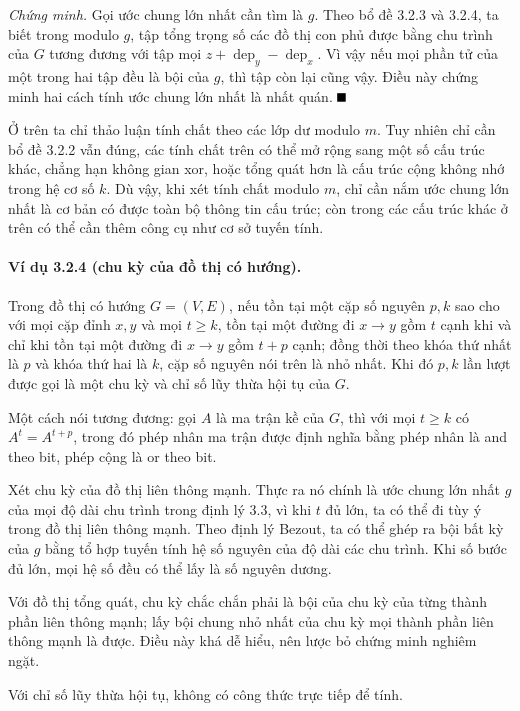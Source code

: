 \documentclass[11pt]{article}
\renewcommand{\leadsto}{\mathrel{\longrightarrow}}
\providecommand{\square}{\mathord{\vcenter{\hrule height .6em width .6em}}}
\begin{document}
\emph{Chứng minh.}
Gọi ước chung lớn nhất cần tìm là $g$. Theo bổ đề 3.2.3 và 3.2.4, ta biết trong
modulo $g$, tập tổng trọng số các đồ thị con phủ được bằng chu trình của $G$
tương đương với tập mọi $z+\operatorname{dep}_y-\operatorname{dep}_x$. Vì vậy
nếu mọi phần tử của một trong hai tập đều là bội của $g$, thì tập còn lại cũng
vậy. Điều này chứng minh hai cách tính ước chung lớn nhất là nhất quán.
\hfill$\square$

Ở trên ta chỉ thảo luận tính chất theo các lớp dư modulo $m$. Tuy nhiên chỉ cần
bổ đề 3.2.2 vẫn đúng, các tính chất trên có thể mở rộng sang một số cấu trúc
khác, chẳng hạn không gian xor, hoặc tổng quát hơn là cấu trúc cộng không nhớ
trong hệ cơ số $k$. Dù vậy, khi xét tính chất modulo $m$, chỉ cần nắm ước chung
lớn nhất là cơ bản có được toàn bộ thông tin cấu trúc; còn trong các cấu trúc
khác ở trên có thể cần thêm công cụ như cơ sở tuyến tính.

\paragraph{Ví dụ 3.2.4 (chu kỳ của đồ thị có hướng).}
Trong đồ thị có hướng $G=(V,E)$, nếu tồn tại một cặp số nguyên $p,k$ sao cho với
mọi cặp đỉnh $x,y$ và mọi $t\ge k$, tồn tại một đường đi $x\leadsto y$ gồm
$t$ cạnh khi và chỉ khi tồn tại một đường đi $x\leadsto y$ gồm $t+p$ cạnh; đồng
thời theo khóa thứ nhất là $p$ và khóa thứ hai là $k$, cặp số nguyên nói trên là
nhỏ nhất. Khi đó $p,k$ lần lượt được gọi là một chu kỳ và chỉ số lũy thừa hội tụ
của $G$.

Một cách nói tương đương: gọi $A$ là ma trận kề của $G$, thì với mọi $t\ge k$ có
$A^t=A^{t+p}$, trong đó phép nhân ma trận được định nghĩa bằng phép nhân là and
theo bit, phép cộng là or theo bit.

Xét chu kỳ của đồ thị liên thông mạnh. Thực ra nó chính là ước chung lớn nhất
$g$ của mọi độ dài chu trình trong định lý 3.3, vì khi $t$ đủ lớn, ta có thể đi
tùy ý trong đồ thị liên thông mạnh. Theo định lý Bezout, ta có thể ghép ra bội
bất kỳ của $g$ bằng tổ hợp tuyến tính hệ số nguyên của độ dài các chu trình. Khi
số bước đủ lớn, mọi hệ số đều có thể lấy là số nguyên dương.

Với đồ thị tổng quát, chu kỳ chắc chắn phải là bội của chu kỳ của từng thành
phần liên thông mạnh; lấy bội chung nhỏ nhất của chu kỳ mọi thành phần liên
thông mạnh là được. Điều này khá dễ hiểu, nên lược bỏ chứng minh nghiêm ngặt.

Với chỉ số lũy thừa hội tụ, không có công thức trực tiếp để tính.
\end{document}
